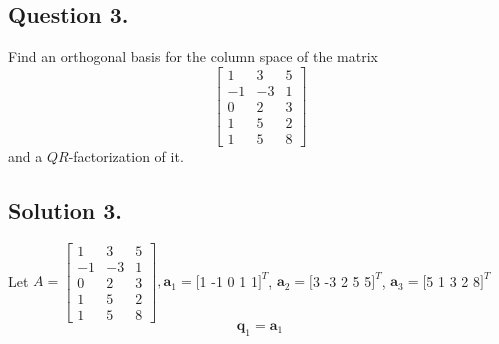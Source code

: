 \documentclass{article}
\begin{document}
\subsection*{Question 3.}
Find an orthogonal basis for the column space of the matrix 
\[\left[
\begin{array}{rrr}
 1 & 3 & 5 \\
-1 &-3 & 1 \\
 0 & 2 & 3 \\
 1 & 5 & 2 \\
 1 & 5 & 8
\end{array}
\right]\]
and a $QR$-factorization of it.
\subsection*{Solution 3.}
Let $A=\left[
\begin{array}{rrr}
 1 & 3 & 5 \\
-1 &-3 & 1 \\
 0 & 2 & 3 \\
 1 & 5 & 2 \\
 1 & 5 & 8
\end{array}
\right], \mathbf{a}_1=[$1  -1  0  1  1$]^T$, $\mathbf{a}_2=[$3  -3  2  5  5$]^T$, $\mathbf{a}_3=[$5   1  3  2  8$]^T$
\[\mathbf{q}_1=\mathbf{a}_1\]
\end{document}
